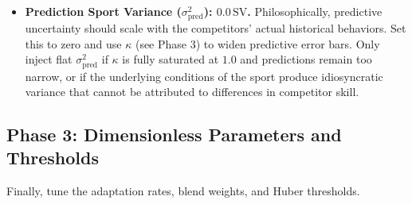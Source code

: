 \documentclass[12pt]{article}
\begin{document}
\begin{itemize}
		\item \textbf{Prediction Sport Variance ($\sigma_{\mathrm{pred}}^2$): $0.0\,\mathrm{SV}$.}
		Philosophically, predictive uncertainty should scale with the competitors' actual historical behaviors. Set this to zero and use $\kappa$ (see Phase 3) to widen predictive error bars. Only inject flat $\sigma_{\mathrm{pred}}^2$ if $\kappa$ is fully saturated at $1.0$ and predictions remain too narrow, or if the underlying conditions of the sport produce idiosyncratic variance that cannot be attributed to differences in competitor skill.
	\end{itemize}

	\subsection{Phase 3: Dimensionless Parameters and Thresholds}
	Finally, tune the adaptation rates, blend weights, and Huber thresholds.
\end{document}
